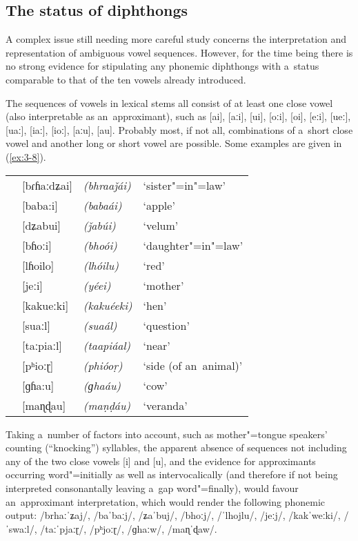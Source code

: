 \subsection{The status of diphthongs}
\label{subsec:3-2-3}

A complex issue still needing more careful study concerns the interpretation and representation of ambiguous vowel sequences. However, for the time being there is no strong evidence for stipulating any phonemic diphthongs with a~status comparable to that of the ten vowels already introduced.

The sequences of vowels in lexical stems all consist of at least one close vowel (also interpretable as an~approximant), such as [ai], [aːi], [ui], [oːi], [oi], [eːi], [ueː], [uaː], [iaː], [ioː], [aːu], [au]. Probably most, if not all, combinations of a~short close vowel and another long or short vowel are possible. Some examples are given in (\ref{ex:3-8}).


\begin{exe}
\extab
\label{ex:3-8}
\begin{tabularx}{\textwidth}{ l l l l }
&
[bɾɦaːdʑai] &
\textit{(bhraaǰái)} &
`sister"=in"=law'\\
&
[baba:i] &
\textit{(babaái)} &
`apple'\\
&
[dʑabui] &
\textit{(ǰabúi)} &
`velum'\\
&
[bɦoːi] &
\textit{(bhoói)} &
`daughter"=in"=law'\\
&
[lɦoilo] &
\textit{(lhóilu)} &
`red'\\
&
[jeːi] &
\textit{(yéei)} &
`mother'\\
&
[kakueːki] &
\textit{(kakuéeki)} &
`hen'\\
&
[suaːl] &
\textit{(suaál)} &
`question'\\
&
[taːpiaːl] &
\textit{(taapiáal)} &
`near'\\
&
[pʰioːɽ] &
\textit{(phióoṛ)} &
`side (of an~animal)' \\
&
[ɡɦa:u] &
\textit{(ɡhaáu)} &
`cow'\\
&
[maɳɖau] &
\textit{(maṇḍáu)} &
`veranda'\\
\end{tabularx}
\end{exe}


Taking a~number of factors into account, such as mother"=tongue speakers' counting (``knocking'') syllables, the apparent absence of sequences not including any of the two close vowels [i] and [u], and the evidence for approximants occurring word"=initially as well as intervocalically (and therefore if not being interpreted consonantally leaving a~gap word"=finally), would favour an~approximant interpretation, which would render the following phonemic output: /brhaːˈʑaj/, /baˈbaːj/, /ʑaˈbuj/, /bhoːj/, /ˈlhojlu/, /jeːj/, /kakˈweːki/, /ˈswaːl/, /taːˈpjaːɽ/, /pʰjoːɽ/, /ɡhaːw/, /maɳˈɖaw/.


